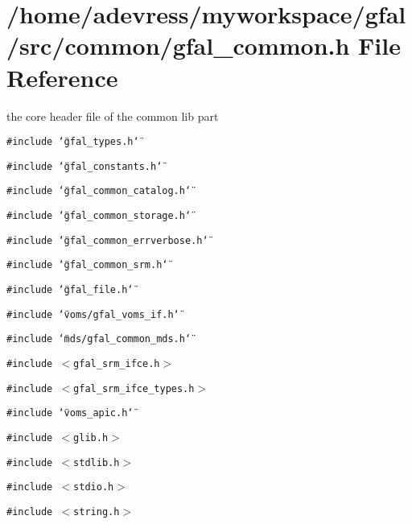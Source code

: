 \section{/home/adevress/myworkspace/gfal/src/common/gfal\_\-common.h File Reference}
\label{gfal__common_8h}
the core header file of the common lib part 

{\tt \#include \char`\"{}gfal\_\-types.h\char`\"{}}\par
{\tt \#include \char`\"{}gfal\_\-constants.h\char`\"{}}\par
{\tt \#include \char`\"{}gfal\_\-common\_\-catalog.h\char`\"{}}\par
{\tt \#include \char`\"{}gfal\_\-common\_\-storage.h\char`\"{}}\par
{\tt \#include \char`\"{}gfal\_\-common\_\-errverbose.h\char`\"{}}\par
{\tt \#include \char`\"{}gfal\_\-common\_\-srm.h\char`\"{}}\par
{\tt \#include \char`\"{}gfal\_\-file.h\char`\"{}}\par
{\tt \#include \char`\"{}voms/gfal\_\-voms\_\-if.h\char`\"{}}\par
{\tt \#include \char`\"{}mds/gfal\_\-common\_\-mds.h\char`\"{}}\par
{\tt \#include $<$gfal\_\-srm\_\-ifce.h$>$}\par
{\tt \#include $<$gfal\_\-srm\_\-ifce\_\-types.h$>$}\par
{\tt \#include \char`\"{}voms\_\-apic.h\char`\"{}}\par
{\tt \#include $<$glib.h$>$}\par
{\tt \#include $<$stdlib.h$>$}\par
{\tt \#include $<$stdio.h$>$}\par
{\tt \#include $<$string.h$>$}\par
